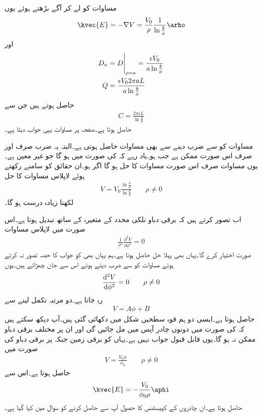 مساوات  کو لے کر آگے بڑھتے ہوئے یوں
\begin{align*}
\kvec{E}=-\nabla V=\frac{V_0}{\rho} \frac{1}{\ln \frac{b}{a}} \arho
\end{align*}
اور
\begin{align*}
D_n&=\eval{D}_{\rho=a}=\frac{\epsilon V_0}{a\ln \frac{b}{a}}\\
Q&=\frac{\epsilon V_0 2 \pi a L}{a \ln \frac{b}{a}}
\end{align*}
حاصل ہوتے ہیں جن سے
\begin{align}
C=\frac{2\pi \epsilon L}{\ln \frac{b}{a}}
\end{align}
حاصل ہوتا ہے۔صفحہ  پر مساوات  یہی جواب دیتا ہے۔

مساوات  کو  سے ضرب دینے سے بھی مساوات  حاصل ہوتی ہے۔البتہ یہ ضرب صرف اور صرف اس صورت ممکن ہے جب  ہو۔یاد رہے کہ  کی صورت میں  ہو گا جو غیر معین ہے۔یوں  مساوات  صرف اس صورت مساوات  کا حل ہو گا اگر  ہو۔ان حقائق کو سامنے رکھتے ہوئے لاپلاس مساوات کا حل
\begin{align}
V=V_0 \frac{\ln \frac{b}{\rho} }{\ln \frac{b}{a} } \quad \quad \rho \ne 0
\end{align}
لکھنا زیادہ درست ہو گا۔

اب تصور کرتے ہیں کہ برقی دباو نلکی محدد کے متغیرہ  کے ساتھ تبدیل ہوتا ہے۔اس صورت میں لاپلاس مساوات
\begin{align*}
\frac{1}{\rho^2}\frac{\partial^2 V}{\partial \phi^2}=0
\end{align*}
صورت اختیار کرے گا۔یہاں بھی پہلا حل  حاصل ہوتا ہے۔ہم یہاں بھی  کو جواب کا حصہ تصور نہ کرتے ہوئے مساوات کو  سے ضرب دیتے ہوئے اس سے جان چھڑاتے ہیں۔یوں
\begin{align*}
\frac{\dif{^2} V}{\dif \phi^2}=0   \quad \quad \rho \ne 0
\end{align*}
رہ جاتا ہے۔دو مرتبہ تکمل لینے سے
\begin{align*}
V=A \phi+B
\end{align*}
حاصل ہوتا ہے۔ایسی دو ہم قوہ سطحیں شکل میں دکھائی گئی ہیں۔آپ دیکھ سکتے ہیں کہ  کی صورت میں دونوں چادر آپس میں مل جائیں گی اور ان پر مختلف برقی دباو ممکن نہ ہو گا۔یوں  قابل قبول جواب نہیں ہے۔یہاں  کو برقی زمین جبکہ  پر  برقی دباو کی صورت میں
\begin{align}
V=\frac{V_0\phi}{\phi_0}  \quad \quad \rho \ne 0
\end{align}
حاصل ہوتا ہے۔اس سے
\begin{align*}
\kvec{E}=-\frac{V_0}{\phi_0 \rho}\aphi
\end{align*}
حاصل ہوتا ہے۔ان چادروں کے کپیسٹنس کا حصول آپ سے حاصل کرنے کو سوال میں کہا گیا ہے۔

